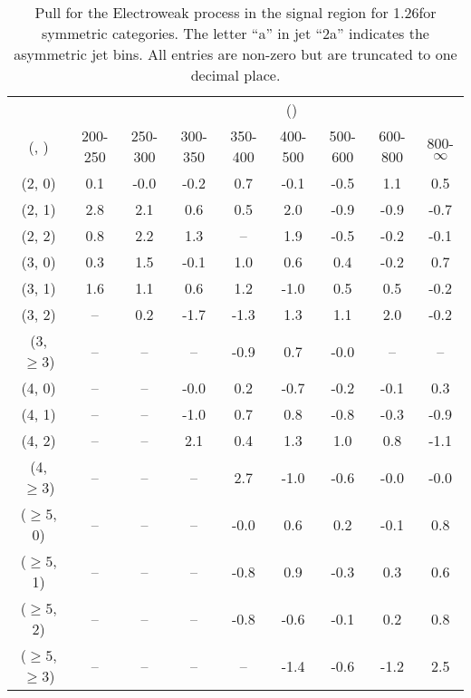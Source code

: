\begin{table}[h!]
\tiny
\centering
\caption{Pull for the Electroweak process in the signal region for 1.26\ifb for symmetric categories. The letter ``a'' in jet \eg ``2a''  indicates the asymmetric jet bins. All entries are non-zero but are truncated to one decimal place.\label{tab:pullsep_sig_ewk_sym}}
\begin{tabular}
{ccccccccc}
	\hline\hline
&	& \multicolumn{8}{c}{\scalht (\gev)} \\ 
	 (\njet,  \nb) & 200-250 & 250-300 & 300-350 & 350-400 & 400-500 & 500-600 & 600-800 & 800-$\infty$ \\ [0.8ex] 
\hline
	(2, 0) & 0.1 & -0.0 & -0.2 & 0.7 & -0.1 & -0.5 & 1.1 & 0.5 \\[0.5ex] 
	(2, 1) & 2.8 & 2.1 & 0.6 & 0.5 & 2.0 & -0.9 & -0.9 & -0.7 \\[0.5ex] 
	(2, 2) & 0.8 & 2.2 & 1.3 & -- & 1.9 & -0.5 & -0.2 & -0.1 \\[0.5ex] 
	(3, 0) & 0.3 & 1.5 & -0.1 & 1.0 & 0.6 & 0.4 & -0.2 & 0.7 \\[0.5ex] 
	(3, 1) & 1.6 & 1.1 & 0.6 & 1.2 & -1.0 & 0.5 & 0.5 & -0.2 \\[0.5ex] 
	(3, 2) & -- & 0.2 & -1.7 & -1.3 & 1.3 & 1.1 & 2.0 & -0.2 \\[0.5ex] 
	(3, $\ge3$) & -- & -- & -- & -0.9 & 0.7 & -0.0 & -- & -- \\[0.5ex] 
	(4, 0) & -- & -- & -0.0 & 0.2 & -0.7 & -0.2 & -0.1 & 0.3 \\[0.5ex] 
	(4, 1) & -- & -- & -1.0 & 0.7 & 0.8 & -0.8 & -0.3 & -0.9 \\[0.5ex] 
	(4, 2) & -- & -- & 2.1 & 0.4 & 1.3 & 1.0 & 0.8 & -1.1 \\[0.5ex] 
	(4, $\ge3$) & -- & -- & -- & 2.7 & -1.0 & -0.6 & -0.0 & -0.0 \\[0.5ex] 
	($\ge5$, 0) & -- & -- & -- & -0.0 & 0.6 & 0.2 & -0.1 & 0.8 \\[0.5ex] 
	($\ge5$, 1) & -- & -- & -- & -0.8 & 0.9 & -0.3 & 0.3 & 0.6 \\[0.5ex] 
	($\ge5$, 2) & -- & -- & -- & -0.8 & -0.6 & -0.1 & 0.2 & 0.8 \\[0.5ex] 
	($\ge5$, $\ge3$) & -- & -- & -- & -- & -1.4 & -0.6 & -1.2 & 2.5 \\[0.5ex] 
	\hline
	\hline
\end{tabular}
\end{table}
